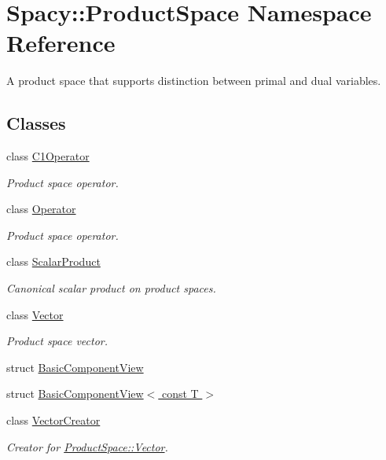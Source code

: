 \hypertarget{namespaceSpacy_1_1ProductSpace}{\section{Spacy\-:\-:Product\-Space Namespace Reference}
\label{namespaceSpacy_1_1ProductSpace}
}


A product space that supports distinction between primal and dual variables.  


\subsection*{Classes}
\begin{DoxyCompactItemize}
\item 
class \hyperlink{classSpacy_1_1ProductSpace_1_1C1Operator}{C1\-Operator}
\begin{DoxyCompactList}\small\item\em Product space operator. \end{DoxyCompactList}\item 
class \hyperlink{classSpacy_1_1ProductSpace_1_1Operator}{Operator}
\begin{DoxyCompactList}\small\item\em Product space operator. \end{DoxyCompactList}\item 
class \hyperlink{classSpacy_1_1ProductSpace_1_1ScalarProduct}{Scalar\-Product}
\begin{DoxyCompactList}\small\item\em Canonical scalar product on product spaces. \end{DoxyCompactList}\item 
class \hyperlink{classSpacy_1_1ProductSpace_1_1Vector}{Vector}
\begin{DoxyCompactList}\small\item\em Product space vector. \end{DoxyCompactList}\item 
struct \hyperlink{structSpacy_1_1ProductSpace_1_1BasicComponentView}{Basic\-Component\-View}
\item 
struct \hyperlink{structSpacy_1_1ProductSpace_1_1BasicComponentView_3_01const_01T_01_4}{Basic\-Component\-View$<$ const T $>$}
\item 
class \hyperlink{classSpacy_1_1ProductSpace_1_1VectorCreator}{Vector\-Creator}
\begin{DoxyCompactList}\small\item\em Creator for \hyperlink{classSpacy_1_1ProductSpace_1_1Vector}{Product\-Space\-::\-Vector}. \end{DoxyCompactList}\end{DoxyCompactItemize}
